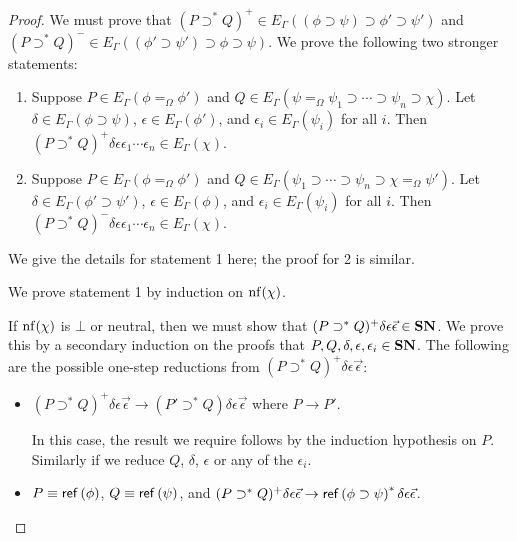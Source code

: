 \begin{proof}
We must prove that $(P \supset^* Q)^+ \in E_\Gamma((\phi \supset \psi) \supset \phi' \supset \psi')$ and
$(P \supset^* Q)^- \in E_\Gamma((\phi' \supset \psi') \supset \phi \supset \psi)$.  We prove the following
two stronger statements:

\begin{enumerate}
\item
Suppose $P \in E_\Gamma(\phi =_\Omega \phi')$ and $Q \in E_\Gamma(\psi =_\Omega \psi_1 \supset \cdots \supset \psi_n \supset \chi)$.
Let $\delta \in E_\Gamma(\phi \supset \psi)$, $\epsilon \in E_\Gamma(\phi')$, and $\epsilon_i \in E_\Gamma(\psi_i)$ for all $i$.
Then $(P \supset^* Q)^+ \delta \epsilon \epsilon_1 \cdots \epsilon_n \in E_\Gamma(\chi)$.
\item
Suppose $P \in E_\Gamma(\phi =_\Omega \phi')$ and $Q \in E_\Gamma(\psi_1 \supset \cdots \supset \psi_n \supset \chi =_\Omega \psi')$.
Let $\delta \in E_\Gamma(\phi' \supset \psi')$, $\epsilon \in E_\Gamma(\phi)$, and $\epsilon_i \in E_\Gamma(\psi_i)$ for all $i$.
Then $(P \supset^* Q)^- \delta \epsilon \epsilon_1 \cdots \epsilon_n \in E_\Gamma(\chi)$.
\end{enumerate}

We give the details for statement 1 here; the proof for 2 is similar.

We prove statement 1 by induction on $\mathrm{nf} ( {\chi} )$.

If $\mathrm{nf} ( {\chi} )$ is $\bot$ or neutral, then we must show that $(P \supset^* Q)^+ \delta \epsilon \vec{\epsilon} \in \mathbf{SN}$.  We prove this
by a secondary induction on the proofs that $P, Q, \delta, \epsilon, \epsilon_i \in \mathbf{SN}$.  The following are the possible
one-step reductions from $(P \supset^* Q)^+ \delta \epsilon \vec{\epsilon}$:

\begin{itemize}
\item
$(P \supset^* Q)^+ \delta \epsilon \vec{\epsilon} \rightarrow (P' \supset^* Q) \delta \epsilon \vec{\epsilon}$ where $P \rightarrow P'$.

In this case, the result we require follows by the induction hypothesis on $P$.  Similarly if we reduce $Q$, $\delta$, $\epsilon$
or any of the $\epsilon_i$.
\item
$P \equiv \mathsf{ref} \left( {\phi} \right)$, $Q \equiv \mathsf{ref} \left( {\psi} \right)$, and $(P \supset^* Q)^+ \delta \epsilon \vec{\epsilon} \rightarrow \mathsf{ref} \left( {\phi \supset \psi} \right)^* \delta \epsilon \vec{\epsilon}$.


\end{itemize}
\end{proof}

